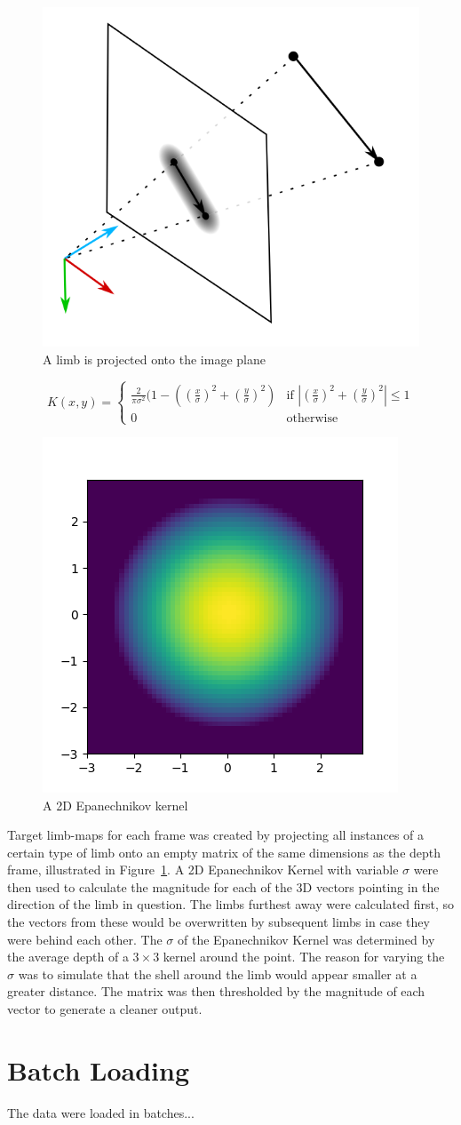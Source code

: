 \begin{figure}
  \centering
  \includegraphics[width=.6\textwidth]{img/projection}
  \caption[Projection]{A limb is projected onto the image plane}
  \label{fig:projection}
\end{figure}

\begin{equation}
  \label{eq:epanechnikov}
  K(x, y) =
  \begin{cases}
    \frac{2}{\pi\sigma^{2}}(1 - ((\frac{x}{\sigma})^{2} + (\frac{y}{\sigma})^{2}) & \text{if } |(\frac{x}{\sigma})^{2} + (\frac{y}{\sigma})^{2}| \leq 1\\
    0 & \text{otherwise}
    \end{cases}
\end{equation}

\begin{figure}
  \centering
  \includegraphics[width=.4\textwidth]{img/epanechnikov_2d}
  \caption{A 2D Epanechnikov \cite{epanechnikov_1969} kernel}
  \label{fig:epanechnikov}
\end{figure}

Target limb-maps for each frame was created by projecting all instances of a certain type of limb onto an empty matrix of the same dimensions as the depth frame, illustrated in Figure~\ref{fig:projection}. A 2D Epanechnikov Kernel with variable $\sigma$ were then used to calculate the magnitude for each of the 3D vectors pointing in the direction of the limb in question. The limbs furthest away were calculated first, so the vectors from these would be overwritten by subsequent limbs in case they were behind each other. The $\sigma$ of the Epanechnikov Kernel was determined by the average depth of a $3 \times 3$ kernel around the point. The reason for varying the $\sigma$ was to simulate that the shell around the limb would appear smaller at a greater distance. The matrix was then thresholded by the magnitude of each vector to generate a cleaner output.

\section{Batch Loading}

The data were loaded in batches...

